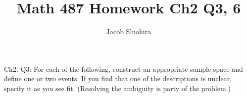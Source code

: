\documentclass[12pt]{article}
\begin{document}
 
\title{Math 487 Homework Ch2 Q3, 6}
\author{Jacob Shiohira}
\maketitle


\noindent
Ch2. Q3: For each of the following, construct an appropriate sample space
and define one or two events. If you find that one of the descriptions is unclear,
specify it as you see fit. (Resolving the ambiguity is party of the problem.)
\end{document}
